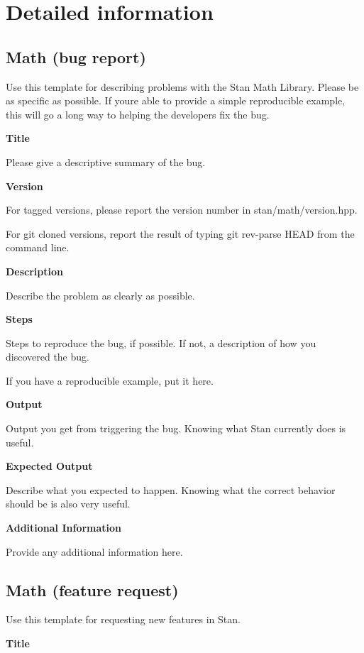 \section*{Detailed information}

\subsection*{Math (bug report)}

Use this template for describing problems with the Stan Math Library. Please be as specific as possible. If you\textquotesingle{}re able to provide a simple reproducible example, this will go a long way to helping the developers fix the bug.

{\bfseries Title}

Please give a descriptive summary of the bug.

{\bfseries Version}

For tagged versions, please report the version number in {\ttfamily stan/math/version.\+hpp}.

For git cloned versions, report the result of typing {\ttfamily git rev-\/parse H\+E\+A\+D} from the command line.

{\bfseries Description}

Describe the problem as clearly as possible.

{\bfseries Steps}

Steps to reproduce the bug, if possible. If not, a description of how you discovered the bug.

If you have a reproducible example, put it here.

{\bfseries Output}

Output you get from triggering the bug. Knowing what Stan currently does is useful.

{\bfseries Expected Output}

Describe what you expected to happen. Knowing what the correct behavior should be is also very useful.

{\bfseries Additional Information}

Provide any additional information here.

\subsection*{Math (feature request)}

Use this template for requesting new features in Stan.

{\bfseries Title}

